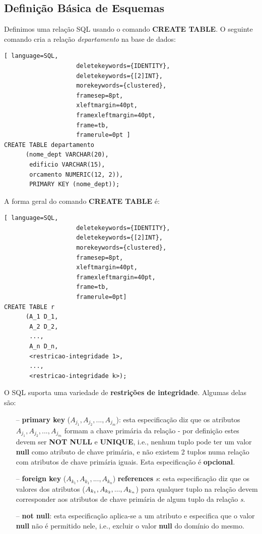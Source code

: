 \documentclass[oneside]{book}
\theoremstyle{definition}
\begin{document}
\subsection{Definição Básica de Esquemas}
Definimos uma relação SQL usando o comando \textbf{CREATE TABLE}. O seguinte comando cria a relação \textit{departamento} na base de dados:
\begin{lstlisting}[ language=SQL,
                    deletekeywords={IDENTITY},
                    deletekeywords={[2]INT},
                    morekeywords={clustered},
                    framesep=8pt,
                    xleftmargin=40pt,
                    framexleftmargin=40pt,
                    frame=tb,
                    framerule=0pt ]
CREATE TABLE departamento 
      (nome_dept VARCHAR(20),
       edificio VARCHAR(15),
       orcamento NUMERIC(12, 2)),
       PRIMARY KEY (nome_dept));
\end{lstlisting}
A forma geral do comando \textbf{CREATE TABLE} é:
\begin{lstlisting}[ language=SQL,
                    deletekeywords={IDENTITY},
                    deletekeywords={[2]INT},
                    morekeywords={clustered},
                    framesep=8pt,
                    xleftmargin=40pt,
                    framexleftmargin=40pt,
                    frame=tb,
                    framerule=0pt]
CREATE TABLE r 
      (A_1 D_1,
       A_2 D_2,
       ...,
       A_n D_n,
       <restricao-integridade 1>,
       ...,
       <restricao-integridade k>);
\end{lstlisting}
O SQL suporta uma variedade de \textbf{restrições de integridade}. Algumas delas são:
\begin{itemize}
    \itemsep0cm
    \item[--]\textbf{primary key} ($A_{j_{1}}, A_{j_{2}}, ..., A_{j_{m}}$): esta especificação diz que os atributos $A_{j_{1}}, A_{j_{2}}, ..., A_{j_{m}}$ formam a chave primária da relação - por definição estes devem ser \textbf{NOT NULL} e \textbf{UNIQUE}, i.e., nenhum tuplo pode ter um valor \textbf{null} como atributo de chave primária, e não existem 2 tuplos numa relação com atributos de chave primária iguais. Esta especificação é \textbf{opcional}.
    \item[--]\textbf{foreign key} ($A_{k_{1}}, A_{k_{1}}, ..., A_{k_{n}}$) \textbf{references} \textit{s}: esta especificação diz que os valores dos atributos ($A_{k_{1}},A_{k_{2}}, \\ ..., A_{k_{n}}$) para qualquer tuplo na relação devem corresponder aos atributos de chave primária de algum tuplo da relação \textit{s}.
    \item[--]\textbf{not null}: esta especificação aplica-se a um atributo e especifica que o valor \textbf{null} não é permitido nele, i.e., excluir o valor \textbf{null} do domínio do mesmo.
\end{itemize}
\end{document}
